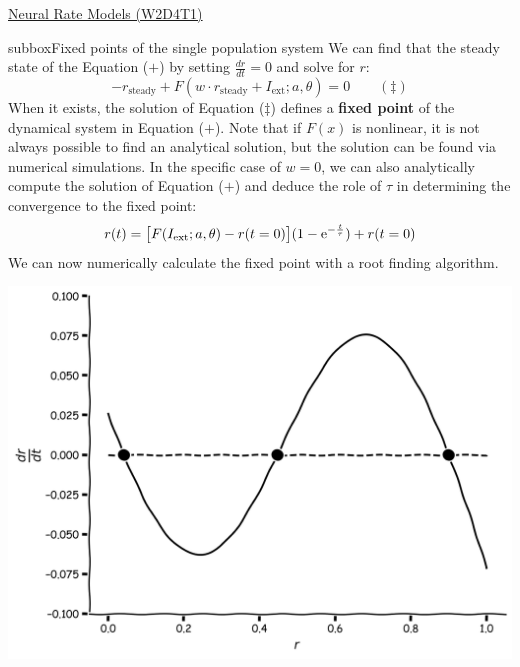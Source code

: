 \begin{textbox}{\href{https://compneuro.neuromatch.io/tutorials/W2D4_DynamicNetworks/chapter_title.html}{Neural Rate Models (W2D4T1)} }
\begin{subbox}{subbox}{Fixed points of the single population system}
We can find that the steady state of the Equation ($+$) by setting $\displaystyle{\frac{dr}{dt}=0}$ and solve for $r$:
\begin{equation*}
-r_{\text{steady}} + F(w\cdot r_{\text{steady}} + I_{\text{ext}};a,\theta) = 0 \qquad (\ddagger)
\end{equation*}
When it exists, the solution of Equation ($\ddagger$) defines a \textbf{fixed point} of the dynamical system in Equation ($+$). Note that if $F(x)$ is nonlinear, it is not always possible to find an analytical solution, but the solution can be found via numerical simulations.
In the specific case of $w=0$, we can also analytically compute  the solution of Equation ($+$) and deduce the role of $\tau$ in determining the convergence to the fixed point: 
\begin{equation*}
\displaystyle{r(t) = \big{[}F(I_{\text{ext}};a,\theta) -r(t=0)\big{]} (1-\text{e}^{-\frac{t}{\tau}})} + r(t=0)
\end{equation*}
We can now numerically calculate the fixed point with a root finding algorithm.
\begin{center}
\includegraphics[scale=0.1]{Figures/DN/DN_Figure2.png}
\end{center}
\end{subbox}

\end{textbox}
